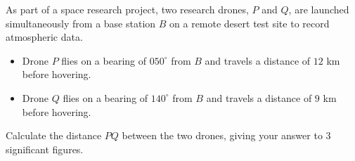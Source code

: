 \begin{question}
\noindent As part of a space research project, two research drones, $P$ and $Q$, are launched simultaneously from a base station $B$ on a remote desert test site to record atmospheric data.

\begin{itemize}
    \item Drone $P$ flies on a bearing of $050^\circ$ from $B$ and travels a distance of $12$ km before hovering.
    \item Drone $Q$ flies on a bearing of $140^\circ$ from $B$ and travels a distance of $9$ km before hovering.
\end{itemize}

\begin{center}
\end{center}

\noindent Calculate the distance $PQ$ between the two drones, giving your answer to 3 significant figures.

\vspace{5cm}

\begin{flushright}
\end{flushright}
\end{question}